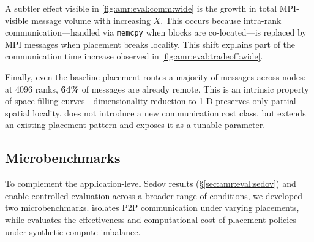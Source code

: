 A subtler effect visible in \cref{fig:amr:eval:comm:wide} is the growth in total MPI-visible message
volume with increasing $X$.
This occurs because intra-rank communication---handled via \texttt{memcpy} when blocks are
co-located---is replaced by MPI messages when placement breaks locality.
This shift explains part of the communication time increase observed in
\cref{fig:amr:eval:tradeoff:wide}.

Finally, even the baseline placement routes a majority of messages across nodes: at 4096 ranks,
\textbf{64\%} of messages are already remote.
This is an intrinsic property of space-filling curves---dimensionality reduction to 1-D preserves
only partial spatial locality.
\cplx{} does not introduce a new communication cost class, but extends an existing placement pattern and exposes it as a tunable parameter.

\subsection{Microbenchmarks}\label{sec:amr:eval:micro}

To complement the application-level Sedov results (\S\ref{sec:amr:eval:sedov}) and enable controlled
evaluation across a broader range of conditions, we developed two microbenchmarks.
\commbench{} isolates P2P communication under varying placements, while \scalebench{} evaluates the effectiveness and
computational cost of placement policies under synthetic compute imbalance.

\figAmrMicroLoc




